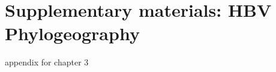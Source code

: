 \chapter{Supplementary materials: HBV Phylogeography}
\label{appendix_ch3}

appendix for chapter 3

\cleardoublepage


